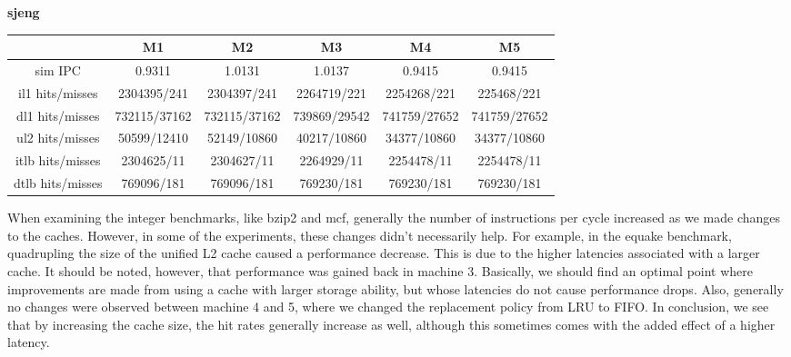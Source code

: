 \documentclass[10pt]{article} %
\begin{document}
\begin{enumerate}
\textbf{sjeng}
\begin{center}
\begin{tabular}{| c | c | c | c | c | c |}
\hline
 & M1 & M2 & M3 & M4 & M5 \\
\hline
sim IPC & 0.9311 & 1.0131 & 1.0137 & 0.9415 & 0.9415 \\
il1 hits/misses & 2304395/241 & 2304397/241 & 2264719/221 & 2254268/221 & 225468/221 \\
dl1 hits/misses & 732115/37162 & 732115/37162 & 739869/29542 & 741759/27652 & 741759/27652 \\
ul2 hits/misses & 50599/12410 & 52149/10860 & 40217/10860 & 34377/10860 & 34377/10860 \\
itlb hits/misses & 2304625/11 & 2304627/11 & 2264929/11 & 2254478/11 & 2254478/11 \\
dtlb hits/misses & 769096/181 & 769096/181 & 769230/181 & 769230/181 & 769230/181 \\
\hline
\end{tabular}
\end{center}

When examining the integer benchmarks, like bzip2 and mcf, generally the number of instructions per cycle increased as we made changes to the caches.  However, in some of the experiments, these changes didn't necessarily help.  For example, in the equake benchmark, quadrupling the size of the unified L2 cache caused a performance decrease.  This is due to the higher latencies associated with a larger cache.  It should be noted, however, that performance was gained back in machine 3.  Basically, we should find an optimal point where improvements are made from using a cache with larger storage ability, but whose latencies do not cause performance drops.  Also, generally no changes were observed between machine 4 and 5, where we changed the replacement policy from LRU to FIFO.  In conclusion, we see that by increasing the cache size, the hit rates generally increase as well, although this sometimes comes with the added effect of a higher latency.  

\end{enumerate}
\end{document}
